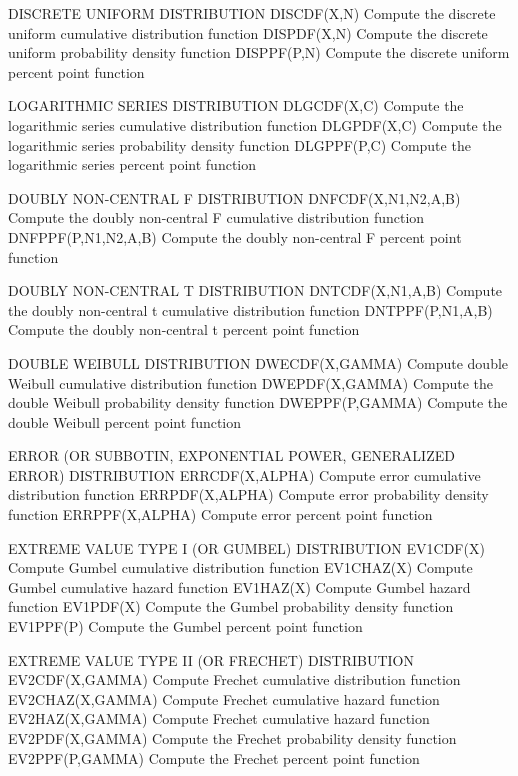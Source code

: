 DISCRETE UNIFORM DISTRIBUTION
   DISCDF(X,N)        Compute the discrete uniform cumulative
                      distribution function
   DISPDF(X,N)        Compute the discrete uniform probability
                      density function
   DISPPF(P,N)        Compute the discrete uniform percent point
                      function

LOGARITHMIC SERIES DISTRIBUTION
   DLGCDF(X,C)        Compute the logarithmic series cumulative
                      distribution function
   DLGPDF(X,C)        Compute the logarithmic series probability
                      density function
   DLGPPF(P,C)        Compute the logarithmic series percent point
                      function

DOUBLY NON-CENTRAL F DISTRIBUTION
   DNFCDF(X,N1,N2,A,B)  Compute the doubly non-central F cumulative
                        distribution function
   DNFPPF(P,N1,N2,A,B)  Compute the doubly non-central F percent point
                        function
 
DOUBLY NON-CENTRAL T DISTRIBUTION
   DNTCDF(X,N1,A,B)   Compute the doubly non-central t cumulative
                      distribution function
   DNTPPF(P,N1,A,B)   Compute the doubly non-central t percent point
                      function
 
DOUBLE WEIBULL DISTRIBUTION
   DWECDF(X,GAMMA)    Compute double Weibull cumulative distribution
                      function
   DWEPDF(X,GAMMA)    Compute the double Weibull probability density
                      function
   DWEPPF(P,GAMMA)    Compute the double Weibull percent point function

ERROR (OR SUBBOTIN, EXPONENTIAL POWER, GENERALIZED ERROR) DISTRIBUTION
   ERRCDF(X,ALPHA)    Compute error cumulative distribution function
   ERRPDF(X,ALPHA)    Compute error probability density function
   ERRPPF(X,ALPHA)    Compute error percent point function

EXTREME VALUE TYPE I (OR GUMBEL) DISTRIBUTION
   EV1CDF(X)          Compute Gumbel cumulative distribution function
   EV1CHAZ(X)         Compute Gumbel cumulative hazard function
   EV1HAZ(X)          Compute Gumbel hazard function
   EV1PDF(X)          Compute the Gumbel probability density function
   EV1PPF(P)          Compute the Gumbel percent point function
 
EXTREME VALUE TYPE II (OR FRECHET) DISTRIBUTION
   EV2CDF(X,GAMMA)    Compute Frechet cumulative distribution function
   EV2CHAZ(X,GAMMA)   Compute Frechet cumulative hazard function
   EV2HAZ(X,GAMMA)    Compute Frechet cumulative hazard function
   EV2PDF(X,GAMMA)    Compute the Frechet probability density function
   EV2PPF(P,GAMMA)    Compute the Frechet percent point function
 
